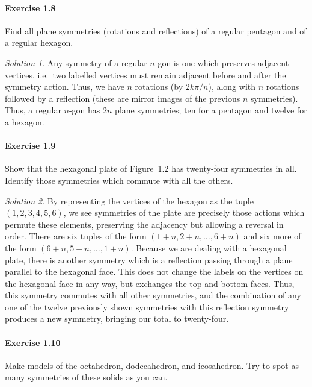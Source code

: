 \documentclass[11pt]{report}
\theoremstyle{remark}
\newtheorem*{solution}{Solution}
\begin{document}
    \paragraph{Exercise 1.8} Find all plane symmetries (rotations and reflections)
    of a regular pentagon and of a regular hexagon.
    \begin{solution}
        Any symmetry of a regular $n$-gon is one which preserves adjacent vertices,
        i.e.\ two labelled vertices must remain adjacent before and after the
        symmetry action. Thus, we have $n$ rotations (by $2k\pi / n$), along with
        $n$ rotations followed by a reflection (these are mirror images of the
        previous $n$ symmetries). Thus, a regular $n$-gon has $2n$ plane symmetries;
        ten for a pentagon and twelve for a hexagon.
    \end{solution}

    \paragraph{Exercise 1.9} Show that the hexagonal plate of Figure~1.2 has
    twenty-four symmetries in all. Identify those symmetries which commute with all
    the others.
    \begin{solution}
        By representing the vertices of the hexagon as the tuple $(1, 2, 3, 4, 5,
        6)$, we see symmetries of the plate are precisely those actions which
        permute these elements, preserving the adjacency but allowing a reversal in
        order. There are six tuples of the form $(1 + n, 2 + n, \dots, 6 + n)$ and
        six more of the form $(6 + n, 5 + n, \dots, 1 + n)$.
        Because we are dealing with a hexagonal plate, there is another symmetry
        which is a reflection passing through a plane parallel to the hexagonal
        face. This does not change the labels on the vertices on the hexagonal face
        in any way, but exchanges the top and bottom faces. Thus, this symmetry
        commutes with all other symmetries, and the combination of any one of the
        twelve previously shown symmetries with this reflection symmetry produces a
        new symmetry, bringing our total to twenty-four.
    \end{solution}

    \paragraph{Exercise 1.10} Make models of the octahedron, dodecahedron, and
    icosahedron. Try to spot as many symmetries of these solids as you can.
    
    
\end{document}

